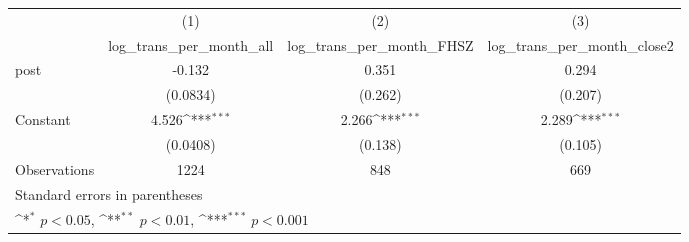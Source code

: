 {
\def\sym#1{\ifmmode^{#1}\else\(^{#1}\)\fi}
\begin{tabular}{l*{3}{c}}
\hline\hline
                    &\multicolumn{1}{c}{(1)}&\multicolumn{1}{c}{(2)}&\multicolumn{1}{c}{(3)}\\
                    &\multicolumn{1}{c}{log\_trans\_per\_month\_all}&\multicolumn{1}{c}{log\_trans\_per\_month\_FHSZ}&\multicolumn{1}{c}{log\_trans\_per\_month\_close2}\\
\hline
post                &      -0.132         &       0.351         &       0.294         \\
                    &    (0.0834)         &     (0.262)         &     (0.207)         \\
[1em]
Constant            &       4.526\sym{***}&       2.266\sym{***}&       2.289\sym{***}\\
                    &    (0.0408)         &     (0.138)         &     (0.105)         \\
\hline
Observations        &        1224         &         848         &         669         \\
\hline\hline
\multicolumn{4}{l}{\footnotesize Standard errors in parentheses}\\
\multicolumn{4}{l}{\footnotesize \sym{*} \(p<0.05\), \sym{**} \(p<0.01\), \sym{***} \(p<0.001\)}\\
\end{tabular}
}
